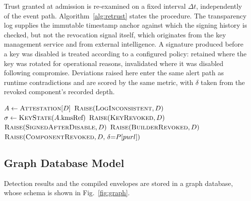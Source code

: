 \documentclass[conference]{IEEEtran}
\begin{document}
Trust granted at admission is re-examined on a fixed interval
$\Delta t$, independently of the event path.
Algorithm~\ref{alg:retrust} states the procedure. The transparency log
supplies the immutable timestamp anchor against which the signing
history is checked, but not the revocation signal itself, which
originates from the key management service and from external
intelligence. A signature produced before a key was disabled is treated
according to a configured policy: retained where the key was rotated for
operational reasons, invalidated where it was disabled following
compromise. Deviations raised here enter the same alert path as runtime
contradictions and are scored by the same metric, with $\delta$ taken
from the revoked component's recorded depth.

\begin{algorithm}[!t]
\footnotesize
\caption{Continuous Trust Re-evaluation (every $\Delta t$)}
\label{alg:retrust}
\begin{algorithmic}[1]
  \State $A \gets \textsc{Attestation}[D]$
    \State $\textsc{Raise}(\textsc{LogInconsistent}, D)$
  \EndIf
  \State $\sigma \gets \textsc{KeyState}(A.\text{kmsRef})$
    \State $\textsc{Raise}(\textsc{KeyRevoked}, D)$
    \State $\textsc{Raise}(\textsc{SignedAfterDisable}, D)$
  \EndIf
    \State $\textsc{Raise}(\textsc{BuilderRevoked}, D)$
  \EndIf
      \State $\textsc{Raise}(\textsc{ComponentRevoked},
              D,\, \delta{=}P[purl])$
    \EndIf
  \EndFor
\EndFor
\end{algorithmic}
\end{algorithm}

\subsection{Graph Database Model}

Detection results and the compiled envelopes are stored in a graph
database, whose schema is shown in Fig.~\ref{fig:graph}.
\end{document}
